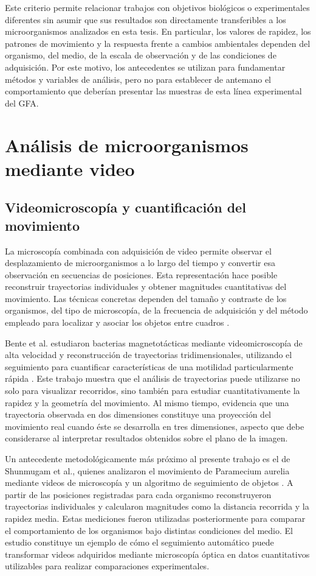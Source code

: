 Este criterio permite relacionar trabajos con objetivos biológicos o experimentales diferentes sin asumir que sus resultados son directamente transferibles a los microorganismos analizados en esta tesis. En particular, los valores de rapidez, los patrones de movimiento y la respuesta frente a cambios ambientales dependen del organismo, del medio, de la escala de observación y de las condiciones de adquisición. Por este motivo, los antecedentes se utilizan para fundamentar métodos y variables de análisis, pero no para establecer de antemano el comportamiento que deberían presentar las muestras de esta línea experimental del GFA.

\section{Análisis de microorganismos mediante video}

\subsection{Videomicroscopía y cuantificación del movimiento}

La microscopía combinada con adquisición de video permite observar el desplazamiento de microorganismos a lo largo del tiempo y convertir esa observación en secuencias de posiciones. Esta representación hace posible reconstruir trayectorias individuales y obtener magnitudes cuantitativas del movimiento. Las técnicas concretas dependen del tamaño y contraste de los organismos, del tipo de microscopía, de la frecuencia de adquisición y del método empleado para localizar y asociar los objetos entre cuadros \cite{dubay2023}.

Bente et al. estudiaron bacterias magnetotácticas mediante videomicroscopía de alta velocidad y reconstrucción de trayectorias tridimensionales, utilizando el seguimiento para cuantificar características de una motilidad particularmente rápida \cite{bente2020}. Este trabajo muestra que el análisis de trayectorias puede utilizarse no solo para visualizar recorridos, sino también para estudiar cuantitativamente la rapidez y la geometría del movimiento. Al mismo tiempo, evidencia que una trayectoria observada en dos dimensiones constituye una proyección del movimiento real cuando éste se desarrolla en tres dimensiones, aspecto que debe considerarse al interpretar resultados obtenidos sobre el plano de la imagen.

Un antecedente metodológicamente más próximo al presente trabajo es el de Shunmugam et al., quienes analizaron el movimiento de Paramecium aurelia mediante videos de microscopía y un algoritmo de seguimiento de objetos \cite{shunmugam2021}. A partir de las posiciones registradas para cada organismo reconstruyeron trayectorias individuales y calcularon magnitudes como la distancia recorrida y la rapidez media. Estas mediciones fueron utilizadas posteriormente para comparar el comportamiento de los organismos bajo distintas condiciones del medio. El estudio constituye un ejemplo de cómo el seguimiento automático puede transformar videos adquiridos mediante microscopía óptica en datos cuantitativos utilizables para realizar comparaciones experimentales.

